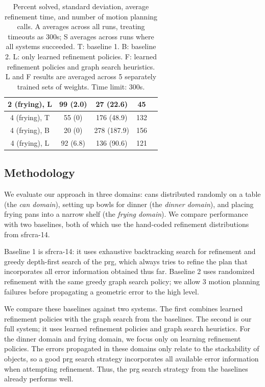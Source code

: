 \begin{table}[t]
{\begin{tabular}{ccccc}
    \midrule
      2 (frying), L & 99 (2.0) & 27 (22.6) & 45\\
    \midrule[1.5pt]
      4 (frying), T & 55 (0) & 176 (48.9) & 132\\
    \midrule
      4 (frying), B & 20 (0) & 278 (187.9) & 156\\
    \midrule
      4 (frying), L & 92 (6.8) & 136 (90.6) & 121\\
    \bottomrule[1.5pt]
  \end{tabular}}
  \caption{\small{Percent solved, standard deviation, average refinement time, and number of motion
      planning calls. A averages across all runs, treating timeouts as 300s; S averages across runs where all systems succeeded.
      T: baseline 1. B: baseline 2.
      L: only learned refinement policies.
      F: learned refinement policies and graph
      search heuristics. L and F results are averaged across 5
      separately trained sets of weights. Time limit: 300s.}}
  \label{table:results}
\end{table}

\subsection{Methodology}
We evaluate our approach in three domains: cans distributed randomly
on a table (the \emph{can domain}), setting up bowls for dinner (the
\emph{dinner domain}), and placing frying pans into a narrow shelf
(the \emph{frying domain}).  We compare performance with two
baselines, both of which use the hand-coded refinement distributions
from {\sc sfrcra-14}.

Baseline 1 is {\sc sfrcra-14}: it uses exhaustive backtracking search
for refinement and greedy depth-first search of the {\sc prg}, which
always tries to refine the plan that incorporates all error
information obtained thus far.  Baseline 2 uses randomized refinement
with the same greedy graph search policy; we allow 3 motion planning failures
before propagating a geometric error to the high level.

We compare these baselines against two systems. The first combines
learned refinement policies with the graph search from the baselines.
The second is our full system; it uses learned refinement policies
and graph search heuristics.  For the dinner domain and frying domain,
we focus only on learning refinement policies. The errors propagated in these
domains only relate to the stackability of objects, so a good {\sc prg} search strategy
incorporates all available error information when
attempting refinement. Thus, the {\sc prg} search strategy from the baselines
already performs well.

